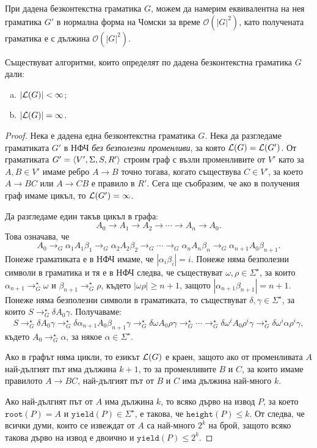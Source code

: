 \begin{thm}
  При дадена безконтекстна граматика $G$, можем да намерим еквивалентна
  на нея граматика $G'$ в нормална форма на Чомски за време $\mathcal{O}(|G|^2)$,
  като получената граматика е с дължина $\mathcal{O}(|G|^2)$.
\end{thm}

\begin{thm}
  Съществуват алгоритми, които определят по дадена безконтекстна граматика $G$ дали:
  \begin{enumerate}[a)]
  \item
    $\vert{\mathcal{L}(G)}\vert < \infty$;
  \item
    $\vert{\mathcal{L}(G)}\vert = \infty$.
  \end{enumerate}
\end{thm}
\begin{proof}
  Нека е дадена една безконтекстна граматика $G$.
  Нека да разгледаме граматиката $G'$ в НФЧ {\em без безполезни променливи}, за която $\mathcal{L}(G) = \mathcal{L}(G')$.
  От граматиката $G' = \langle{V',\Sigma,S,R'}\rangle$ строим граф с възли променливите от $V'$ като
  за $A,B \in V'$ имаме ребро $A \to B$ точно тогава, когато съществува $C \in V'$,
  за което $A \to BC$ или $A \to CB$ е правило в $R'$.
  Сега ще съобразим, че ако в получения граф имаме цикъл, то $\mathcal{L}(G') = \infty$.

  Да разгледаме един такъв цикъл в графа:
  \[A_0 \to A_1 \to A_2 \to \cdots \to A_n \to A_0.\]
  Това означава, че 
  \[A_0 \to_G \alpha_1 A_1 \beta_1 \to_G \alpha_2 A_2 \beta_2 \to_G \cdots \to_G \alpha_n A_n \beta_n \to_G \alpha_{n+1} A_0 \beta_{n+1}.\]
  Понеже граматиката е в НФЧ имаме, че $|\alpha_i\beta_i| = i$.
  Понеже няма безполезни символи в граматика и тя е в НФЧ следва, че съществуват $\omega,\rho \in \Sigma^\star$, за които $\alpha_{n+1} \to^\star_G \omega$ и $\beta_{n+1} \to^\star_G \rho$,
  където $|\omega\rho| \geq n+1$, защото $|\alpha_{n+1}\beta_{n+1}| = n+1$.
  Понеже няма безполезни символи в граматиката, то съществуват $\delta, \gamma \in \Sigma^\star$, за които
  $S \to^\star_G \delta  A_0 \gamma$. Получаваме:
  \[ S \to^\star_G \delta A_0 \gamma \to^\star_G \delta \alpha_{n+1} A_0 \beta_{n+1} \gamma \to^\star_G \delta \omega A_0 \rho\gamma \to^\star_G \cdots \to^\star_G \delta \omega^i A_0 \rho^i \gamma \to^\star_G \delta\omega^i\alpha\rho^i\gamma,\]
  където $A_0 \to^\star_G \alpha$, за някое $\alpha \in \Sigma^\star$.

  Ако в графът няма цикли, то езикът $\mathcal{L}(G)$ е краен, защото ако от променливата $A$ най-дългият път има дължина $k+1$,
  то за променливите $B$ и $C$, за които имаме правилото $A\to BC$, най-дългият път от $B$ и $C$ има дължина най-много $k$.

  Ако най-дългият път от $A$ има дължина $k$, то всяко дърво на извод $P$, за което $\texttt{root}(P) = A$ и $\texttt{yield}(P) \in \Sigma^\star$,
  е такова, че $\texttt{height}(P) \leq k$. От  следва, че всички думи, които се извеждат от $A$ са най-много $2^{k}$ на брой,
  защото всяко такова дърво на извод е двоично и $\texttt{yield}(P) \leq 2^k$.
\end{proof}




